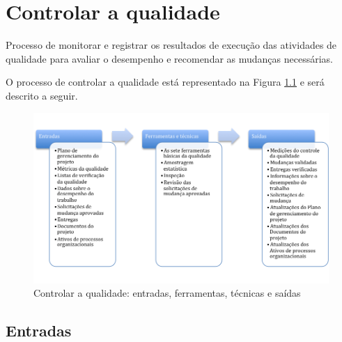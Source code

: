 \chapter{Controlar a qualidade}

Processo de monitorar e registrar os resultados de execução das atividades de qualidade para avaliar o desempenho e recomendar as mudanças necessárias.

O processo de controlar a qualidade está representado na Figura \ref{fig:qualidade:controlar:efts} e será descrito a seguir.

\begin{figure}[!h]
	\centering
	\includegraphics[scale=0.5]{Figuras/qualidade_efts_controlar.png}
	\caption{Controlar a qualidade: entradas, ferramentas, técnicas e saídas}
	\label{fig:qualidade:controlar:efts}
\end{figure}

\section{Entradas}

